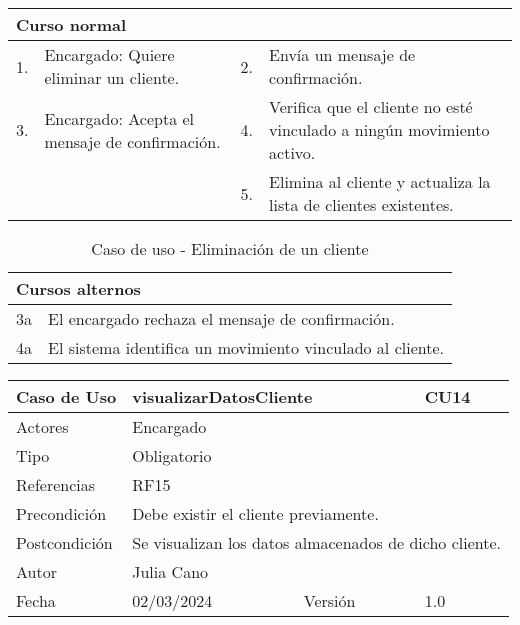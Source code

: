 \begin{table}[H]
	\centering
	\begin{tabular}{| m{} | m{} | m{} | m{} |}
		\hline
		\multicolumn{4}{|m{0.9\textwidth}|}{Curso normal}     \\ 
		\hline
		1. & Encargado: Quiere eliminar un cliente. & 2. &  Envía un mensaje de confirmación.  \\ 
		\hline
		3. & Encargado: Acepta el mensaje de confirmación. &  4. & Verifica que el cliente no esté vinculado a ningún movimiento activo.   \\ 
		\hline
		&  & 5. & Elimina al cliente y actualiza la lista de clientes existentes.  \\ 
		\hline
	\end{tabular}
\end{table}

\begin{table}[H]
	\centering
	\begin{tabular}{| m{} | m{} | m{} | m{} |}
		\hline
		\multicolumn{4}{|m{0.9\textwidth}|}{Cursos alternos}     \\ 
		\hline
		3a & \multicolumn{3}{m{0.67\textwidth}|}{El encargado rechaza el mensaje de confirmación.} \\ 
		\hline
		4a & \multicolumn{3}{m{0.67\textwidth}|}{El sistema identifica un movimiento vinculado al cliente.} \\ 
		\hline
	\end{tabular}
	\caption{Caso de uso - Eliminación de un cliente}
\end{table}

\newpage


\begin{table}[H]
	\centering
	\begin{tabular}{| m{} | m{} | m{} | m{}|}
		\hline
		\rowcolor{grayshade} Caso de Uso & \multicolumn{2}{|m{0.43\textwidth}|}{visualizarDatosCliente} &  CU14\\ 
		\hline
		Actores & \multicolumn{3}{l|}{Encargado} \\ 
		\hline
		Tipo & \multicolumn{3}{l|}{Obligatorio} \\ 
		\hline
		Referencias & \multicolumn{3}{l|}{RF15} \\ 
		\hline
		Precondición & \multicolumn{3}{m{0.67\textwidth}|}{Debe existir el cliente previamente.} \\ 
		\hline
		Postcondición & \multicolumn{3}{m{0.67\textwidth}|}{Se visualizan los datos almacenados de dicho cliente.} \\ 
		\hline
		Autor & \multicolumn{3}{l|}{Julia Cano} \\ 
		\hline
		Fecha & 02/03/2024 & Versión & 1.0 \\
		\hline
	\end{tabular}
\end{table}

